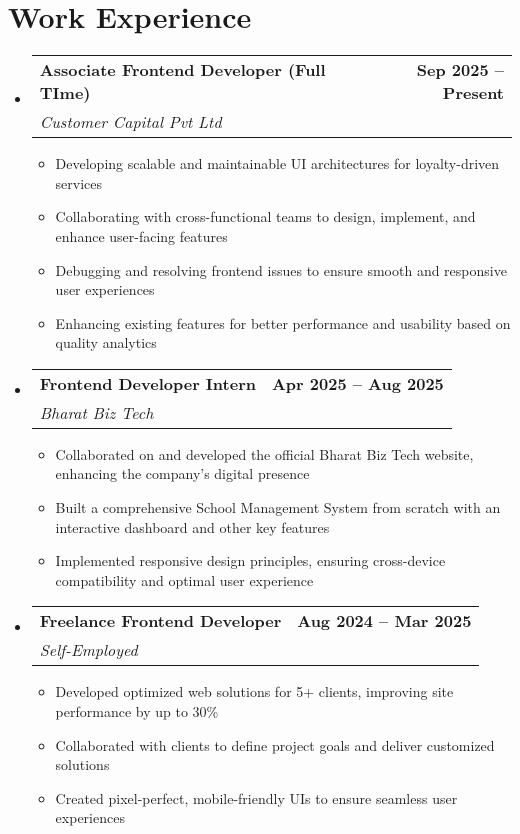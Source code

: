 \documentclass[letterpaper,9pt]{article}
\makeatletter
\newcommand{\resumeItem}[1]{
  \item\small{#1\vspace{-2pt}}
}
\newcommand{\resumeSubheading}[4]{
  \vspace{-2pt}\item
    \begin{tabular*}{1.0\textwidth}[t]{l@{\extracolsep{\fill}}r}
      \textbf{\color{darkgray}#1} & \textbf{\small\color{lightgray}#2} \\
      \textit{\small #3} & \textit{\small\color{lightgray}#4} \\
    \end{tabular*}\vspace{-5pt}
}
\newcommand{\resumeSubHeadingListStart}{\begin{itemize}[leftmargin=0.15in, label={}]}
\newcommand{\resumeSubHeadingListEnd}{\end{itemize}}
\newcommand{\resumeItemListStart}{\begin{itemize}[leftmargin=0.15in, label=\textcolor{primaryblue}{\textbullet}, itemsep=0pt, parsep=0pt]}
\newcommand{\resumeItemListEnd}{\end{itemize}\vspace{-3pt}}
\makeatother
\begin{document}
\section{Work Experience}
\resumeSubHeadingListStart

    \resumeSubheading
        {Associate Frontend Developer (Full TIme)}{Sep 2025 -- Present}
        {Customer Capital Pvt Ltd}{}
    \resumeItemListStart
        \resumeItem{Developing scalable and maintainable UI architectures for loyalty-driven services}
        \resumeItem{Collaborating with cross-functional teams to design, implement, and enhance user-facing features}
        \resumeItem{Debugging and resolving frontend issues to ensure smooth and responsive user experiences}
        \resumeItem{Enhancing existing features for better performance and usability based on quality analytics}
    \resumeItemListEnd

    \resumeSubheading
        {Frontend Developer Intern}{Apr 2025 -- Aug 2025}
        {Bharat Biz Tech}{}
    \resumeItemListStart
        \resumeItem{Collaborated on and developed the official Bharat Biz Tech website, enhancing the company's digital presence}
        \resumeItem{Built a comprehensive School Management System from scratch with an interactive dashboard and other key features}
        \resumeItem{Implemented responsive design principles, ensuring cross-device compatibility and optimal user experience}
    \resumeItemListEnd

    \resumeSubheading
        {Freelance Frontend Developer}{Aug 2024 -- Mar 2025}
        {Self-Employed}{}
    \resumeItemListStart
        \resumeItem{Developed optimized web solutions for 5+ clients, improving site performance by up to 30\%}
        \resumeItem{Collaborated with clients to define project goals and deliver customized solutions}
        \resumeItem{Created pixel-perfect, mobile-friendly UIs to ensure seamless user experiences}
    \resumeItemListEnd

\resumeSubHeadingListEnd



\end{document}
